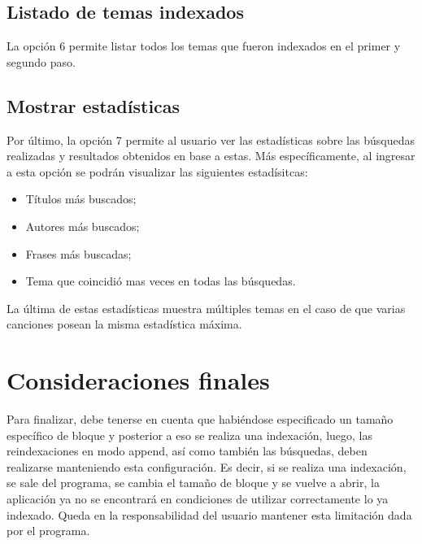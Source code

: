 \documentclass{article}
\begin{document}
\subsection{Listado de temas indexados}

	La opción 6 permite listar todos los temas que fueron indexados en el primer y segundo paso.
\bigskip



\subsection{Mostrar estadísticas}

	Por último, la opción 7 permite al usuario ver las estadísticas sobre las búsquedas realizadas y resultados obtenidos en base a estas. Más específicamente, al ingresar a esta opción se podrán visualizar las siguientes estadísitcas:


\begin{itemize}
\itemsep=5pt \topsep=0pt \partopsep=0pt \parskip=0pt \parsep=0pt
	
	\item Títulos más buscados;
	\item Autores más buscados;
	\item Frases más buscadas;
	\item Tema que coincidió mas veces en todas las búsquedas.

\end{itemize}
\bigskip

	
	La última de estas estadísticas muestra múltiples temas en el caso de que varias canciones posean la misma estadística máxima.
\bigskip\bigskip



\section{Consideraciones finales}

	Para finalizar, debe tenerse en cuenta que habiéndose especificado un tamaño específico de bloque y posterior a eso se realiza una indexación, luego, las reindexaciones en modo append, así como también las búsquedas, deben realizarse manteniendo esta configuración. Es decir, si se realiza una indexación, se sale del programa, se cambia el tamaño de bloque y se vuelve a abrir, la aplicación ya no se encontrará en condiciones de utilizar correctamente lo ya indexado. Queda en la responsabilidad del usuario mantener esta limitación dada por el programa.
\bigskip
\end{document}
